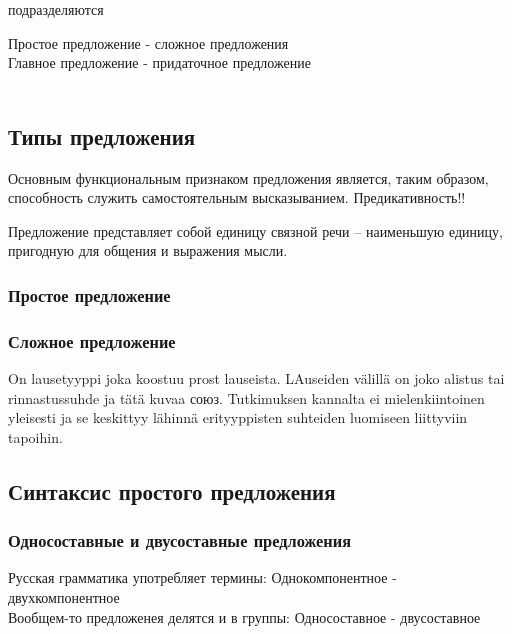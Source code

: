 \documentclass{article}
\begin{document}
подразделяются 

Простое предложение - сложное предложения \\
Главное предложение - придаточное предложение \\
\\

\subsection{Типы предложения}

Основным функциональным признаком предложения является, таким образом, способность служить самостоятельным высказыванием. Предикативность!!

Предложение представляет собой единицу связной речи -- наименьшую единицу, пригодную для общения и выражения мысли.

\subsubsection{Простое предложение}




\subsubsection{Сложное предложение}

On lausetyyppi joka koostuu prost lauseista. LAuseiden välillä on joko alistus tai rinnastussuhde ja tätä kuvaa союз. Tutkimuksen kannalta ei mielenkiintoinen yleisesti ja se keskittyy lähinnä erityyppisten suhteiden luomiseen liittyviin tapoihin. 

\subsection{Синтаксис простого предложения}

\subsubsection{Односоставные и двусоставные предложения}

Русская грамматика употребляет термины:
Однокомпонентное - двухкомпонентное \\

Вообщем-то предложенея делятся и в группы:
Односоставное - двусоставное \\
\end{document}

